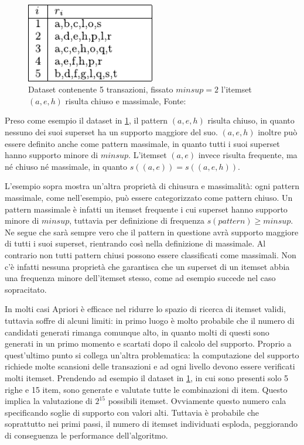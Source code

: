 \begin{figure}
\centering
  \includegraphics[width=0.5\textwidth]{res/fig/sec-1/TransactionSetExample.pdf}
  \caption{Dataset contenente 5 transazioni, fissato \(minsup = 2\) l'itemset \((a,e,h)\) risulta chiuso e massimale, Fonte:~\cite{pan2003carpenter}}%
  \label{fig:chap-1:dataset-example}
\end{figure}

Preso come esempio il dataset in \cref{fig:chap-1:dataset-example}, il pattern \((a,e,h)\) risulta chiuso, in quanto nessuno dei suoi superset ha un supporto maggiore del suo.
\((a,e,h)\) inoltre può essere definito anche come pattern massimale, in quanto tutti i suoi superset hanno supporto minore di \(minsup\).
L'itemset \((a,e)\) invece risulta frequente, ma né chiuso né massimale, in quanto \(s((a,e)) = s((a,e,h))\).

L'esempio sopra mostra un'altra proprietà di chiusura e massimalità: ogni pattern massimale, come nell'esempio, può essere categorizzato come pattern chiuso.
Un pattern massimale è infatti un itemset frequente i cui superset hanno supporto minore di \(minsup\), tuttavia per definizione di frequenza \(s(pattern) \geq minsup\).
Ne segue che sarà sempre vero che il pattern in questione avrà supporto maggiore di tutti i suoi superset, rientrando così nella definizione di massimale.
Al contrario non tutti pattern chiusi possono essere classificati come massimali.
Non c'è infatti nessuna proprietà che garantisca che un superset di un itemset abbia una frequenza minore dell'itemset stesso, come ad esempio succede nel caso sopracitato.


In molti casi Apriori è efficace nel ridurre lo spazio di ricerca di itemset validi, tuttavia
soffre di alcuni limiti: in primo luogo è molto probabile che il numero di candidati generati rimanga comunque
alto, in quanto molti di questi sono generati in un primo momento e scartati dopo il calcolo del supporto.
Proprio a quest'ultimo punto si collega un'altra problematica: la computazione del supporto richiede molte
scansioni delle transazioni e ad ogni livello devono essere verificati molti itemset.
Prendendo ad esempio il dataset in \cref{fig:chap-1:dataset-example}, in cui sono presenti solo 5 righe e 15 item, sono generate e valutate tutte le combinazioni di item.
Questo implica la valutazione di \(2^15\) possibili itemset.
Ovviamente questo numero cala specificando soglie di supporto con valori alti.
Tuttavia è probabile che soprattutto nei primi passi, il numero di itemset individuati esploda, peggiorando di conseguenza le performance dell'algoritmo.
